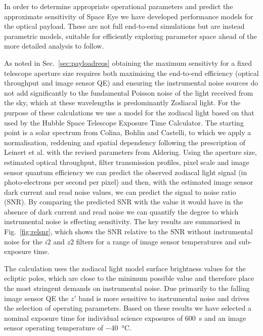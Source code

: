 \documentclass[]{iac}
\begin{document}
In order to determine appropriate operational parameters and predict the approximate sensitivity of Space Eye we have
developed performance models for the optical payload. These are not full end-to-end simulations but are instead
parametric models, suitable for efficiently exploring parameter space ahead of the more detailed analysis to follow.

As noted in Sec.~\ref{sec:payloadreqs} obtaining the maximum sensitivty for a fixed telescope aperture size requires
both maximising the end-to-end efficiency (optical throughput and image sensor QE) and ensuring the instrumental noise
sources do not add significantly to the fundamental Poisson noise of the light received from the sky, which at these
wavelengths is predominantly Zodiacal light. For the purpose of these calculations we use a model for the zodiacal light
based on that used by the Hubble Space Telescope Exposure Time Calculator\cite{Giavalisco2002}. The starting point is a
solar spectrum from Colina, Bohlin and Castelli\cite{Colina1996}, to which we apply a normalisation, reddening and
spatial dependency following the prescription of Leinert et al.\cite{Leinert1998} with the revised parameters from
Aldering\cite{Aldering2001}. Using the aperture size, estimated optical throughput, filter transmission profiles, pixel
scale and image sensor quantum efficiency we can predict the observed zodiacal light signal (in photo-electrons per
second per pixel) and then, with the estimated image sensor dark current and read noise values, we can predict the
signal to noise ratio (SNR). By comparing the predicted SNR with the value it would have in the absence of dark current
and read noise we can quantify the degree to which instrumental noise is effecting sensitivity. The key results are
summarised in Fig.~\ref{fig:relsnr}, which shows the SNR relative to the SNR without instrumental noise for the $i2$ and
$z2$ filters for a range of image sensor temperatures and sub-exposure time.

The calculation uses the zodiacal light model surface brightness values for the ecliptic poles, which are close to the
minimum possible value and therefore place the most stringent demands on instrumental noise. Due primarily to the
falling image sensor QE the $z'$ band is more sensitive to instrumental noise and drives the selection of operating
parameters. Based on these results we have selected a nominal exposure time for individual science exposures of
\SI{600}{\second} and an image sensor operating temperature of \SI{-40}{\celsius}.
\end{document}
